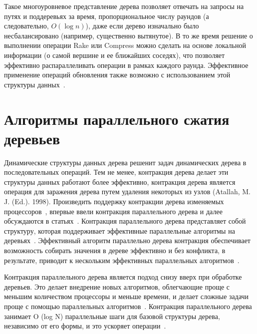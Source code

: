 \documentclass[specification,annotation,times]{itmo-student-thesis}
\newcommand{\revise}[1]{{\color{red!70!black} #1 }}
\begin{document}
Такое многоуровневое представление дерева позволяет отвечать на запросы на путях и поддеревьях за время, пропорциональное числу раундов (а следовательно, $O(\log n)$),
даже если дерево изначально было несбалансировано (например, существенно вытянутое). В то же время решение о выполнении операции Rake или Compress можно сделать на основе локальной информации (о самой
вершине и ее ближайших соседях), что позволяет эффективно распараллеливать операции в рамках каждого раунда.
Эффективное применение операций обновления также возможно с использованием этой структуры данных~\cite{acar04}.

\section{Алгоритмы параллельного сжатия деревьев}\label{survey-contraction}

\revise{
Динамические структуры данных дерева решенит задач динамических дерева в последовательных операций. Тем не менее, контракция дерева делает эти структуры данных работают более эффективно, контракция дерева 
является операция для заражения дерева путем удаления некоторых из узлов (Atallah, M. J. (Ed.). 1998). Произведить поддержку контракции дерева изменяемых процессоров~\cite{miller85, miller89},
впервые ввели контракция параллельного дерева и далее обсуждаются в статьях~\cite{miller91, reif94}. Контракция параллельного дерева представляет собой 
структуру, которая поддерживает эффективные параллельные алгоритмы на деревьях~\cite{morihata08}. Эффективный алгоритм параллельно дерева контракция обеспечивает возможность собирать 
значения в дереве эффективно и без конфликта, в результате, приводит к нескольким эффективных параллельных алгоритмов~\cite{morihata11}.
}

\revise{
Контракция параллельного дерева является подход снизу вверх при обработке деревьев. Это делает внедрение новых алгоритмов, облегчающие проще с меньшим количеством процессоры и меньше времени, и делает 
сложные задачи проще с помощью параллельных алгоритмов~\cite{miller85}. Контракция параллельного дерева занимает O (log N) параллельные шаги для базовой структуры дерева, независимо от его 
формы, и это ускоряет операции~\cite{morihata14}.
}
\end{document}

